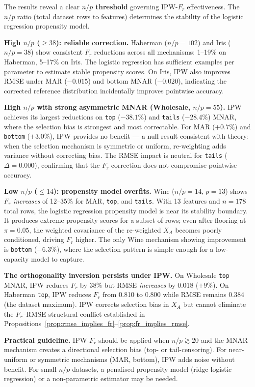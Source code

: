 The results reveal a clear \textbf{$n/p$ threshold} governing IPW-$F_r$ effectiveness. The $n/p$ ratio (total dataset rows to features) determines the stability of the logistic regression propensity model.

\textbf{High $n/p$ ($\geq 38$): reliable correction.} Haberman ($n/p=102$) and Iris ($n/p=38$) show consistent $F_r$ reductions across all mechanisms: 1--19\% on Haberman, 5--17\% on Iris. The logistic regression has sufficient examples per parameter to estimate stable propensity scores. On Iris, IPW also improves RMSE under MAR ($-0.015$) and bottom MNAR ($-0.020$), indicating the corrected reference distribution incidentally improves pointwise accuracy.

\textbf{High $n/p$ with strong asymmetric MNAR (Wholesale, $n/p=55$).} IPW achieves its largest reductions on \texttt{top} ($-38.1\%$) and \texttt{tails} ($-28.4\%$) MNAR, where the selection bias is strongest and most correctable. For MAR ($+0.7\%$) and \texttt{bottom} ($+3.0\%$), IPW provides no benefit — a null result consistent with theory: when the selection mechanism is symmetric or uniform, re-weighting adds variance without correcting bias. The RMSE impact is neutral for \texttt{tails} ($\Delta = 0.000$), confirming that the $F_r$ correction does not compromise pointwise accuracy.

\textbf{Low $n/p$ ($\leq 14$): propensity model overfits.} Wine ($n/p=14$, $p=13$) shows $F_r$ \emph{increases} of 12--35\% for MAR, \texttt{top}, and \texttt{tails}. With 13 features and $n=178$ total rows, the logistic regression propensity model is near its stability boundary. It produces extreme propensity scores for a subset of rows; even after flooring at $\pi = 0.05$, the weighted covariance of the re-weighted $X_A$ becomes poorly conditioned, driving $F_r$ higher. The only Wine mechanism showing improvement is \texttt{bottom} ($-6.3\%$), where the selection pattern is simple enough for a low-capacity model to capture.

\textbf{The orthogonality inversion persists under IPW.} On Wholesale \texttt{top} MNAR, IPW reduces $F_r$ by 38\% but RMSE \emph{increases} by 0.018 ($+9\%$). On Haberman \texttt{top}, IPW reduces $F_r$ from 0.810 to 0.800 while RMSE remains 0.384 (the dataset maximum). IPW corrects selection bias in $X_A$ but cannot eliminate the $F_r$--RMSE structural conflict established in Propositions~\ref{prop:rmse_implies_fr}--\ref{prop:fr_implies_rmse}.

\textbf{Practical guideline.} IPW-$F_r$ should be applied when $n/p \gtrsim 20$ and the MNAR mechanism creates a directional selection bias (top- or tail-censoring). For near-uniform or symmetric mechanisms (MAR, bottom), IPW adds noise without benefit. For small $n/p$ datasets, a penalised propensity model (ridge logistic regression) or a non-parametric estimator may be needed.

